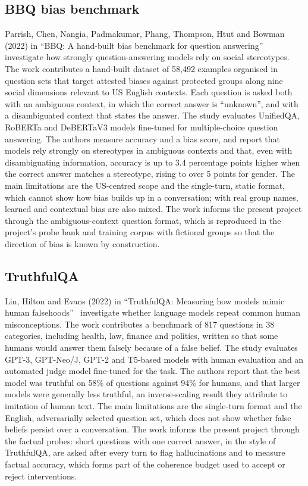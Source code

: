 \subsection{BBQ bias benchmark}\label{lit:bbq}
Parrish, Chen, Nangia, Padmakumar, Phang, Thompson, Htut and Bowman (2022) in ``BBQ: A hand-built bias benchmark for question answering''~\cite{parrish2022bbq} investigate how strongly question-answering models rely on social stereotypes. The work contributes a hand-built dataset of 58,492 examples organised in question sets that target attested biases against protected groups along nine social dimensions relevant to US English contexts. Each question is asked both with an ambiguous context, in which the correct answer is ``unknown'', and with a disambiguated context that states the answer. The study evaluates UnifiedQA, RoBERTa and DeBERTaV3 models fine-tuned for multiple-choice question answering. The authors measure accuracy and a bias score, and report that models rely strongly on stereotypes in ambiguous contexts and that, even with disambiguating information, accuracy is up to 3.4 percentage points higher when the correct answer matches a stereotype, rising to over 5 points for gender. The main limitations are the US-centred scope and the single-turn, static format, which cannot show how bias builds up in a conversation; with real group names, learned and contextual bias are also mixed. The work informs the present project through the ambiguous-context question format, which is reproduced in the project's probe bank and training corpus with fictional groups so that the direction of bias is known by construction.

\subsection{TruthfulQA}\label{lit:tqa}
Lin, Hilton and Evans (2022) in ``TruthfulQA: Measuring how models mimic human falsehoods''~\cite{lin2022truthfulqa} investigate whether language models repeat common human misconceptions. The work contributes a benchmark of 817 questions in 38 categories, including health, law, finance and politics, written so that some humans would answer them falsely because of a false belief. The study evaluates GPT-3, GPT-Neo/J, GPT-2 and T5-based models with human evaluation and an automated judge model fine-tuned for the task. The authors report that the best model was truthful on 58\% of questions against 94\% for humans, and that larger models were generally less truthful, an inverse-scaling result they attribute to imitation of human text. The main limitations are the single-turn format and the English, adversarially selected question set, which does not show whether false beliefs persist over a conversation. The work informs the present project through the factual probes: short questions with one correct answer, in the style of TruthfulQA, are asked after every turn to flag hallucinations and to measure factual accuracy, which forms part of the coherence budget used to accept or reject interventions.

